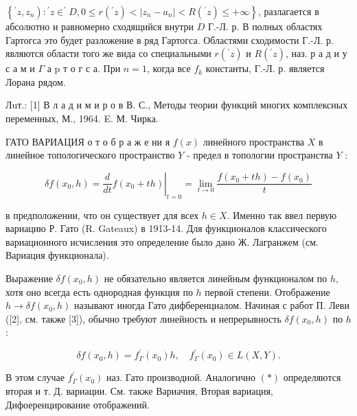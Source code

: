 \documentclass[10pt]{article}
\begin{document}
$\left.\left\{{ }^{\prime} z, z_{n}\right):{ }^{\prime} z \in^{\prime} D, 0 \leqslant r\left({ }^{\prime} z\right)<\left|z_{n}-a_{n}\right|<R\left({ }^{\prime} z\right) \leqslant+\infty\right\}$, разлагается в абсолютно и равномерно сходящийся внутри $D$ Г.-Л. р. В полных областях Гартогса это будет разложение в ряд Гартогса. Областями сходимости Г.-Л. р. являются области того же вида со специальными $r\left({ }^{\prime} z\right)$ и $R\left({ }^{\prime} z\right)$, наз. р а д и у с а м и $\Gamma$ а $\mathrm{p}$ т о г с а. При $n=1$, когда все $f_{k}$ константы, Г.-Л. р. является Лорана рядом.



Лuт.: [1] В л а д и м и р о в В. С., Методы теории функций многих комплексных переменных, М., 1964. E. М. Чирка.



ГАТО ВАРИАЦИЯ о т о б р а ж е ни я $f(x)$ линейного пространства $X$ в линейное топологического пространство $Y$ - предел в топологии пространства $Y$ :



\[

\delta f\left(x_{0}, h\right)=\left.\frac{d}{d t} f\left(x_{0}+t h\right)\right|_{t=0}=\lim _{t \rightarrow 0} \frac{f\left(x_{0}+t h\right)-f\left(x_{0}\right)}{t}

\]



в предположении, что он существует для всех $h \in X$. Именно так ввел первую вариацию Р. Гато (R. Gateaux) в 1913-14. Для функционалов классического вариационного исчисления это определение было дано Ж. Лагранжем (см. Вариация функционала).



Выражение $\delta f\left(x_{0}, h\right)$ не обязательно является линейным функционалом по $h$, хотя оно всегда есть однородная функция по $h$ первой степени. Отображение $h \rightarrow \delta f\left(x_{0}, h\right)$ называют иногда Гато дифберенциалом. Начиная с работ П. Леви ([2], см. также [3]), обычно требуют линейность и непрерывность $\delta f\left(x_{0}, h\right)$ по $h$ :



\[

\delta f\left(x_{0}, h\right)=f_{\Gamma}^{\prime}\left(x_{0}\right) h, \quad f_{\Gamma}^{\prime}\left(x_{0}\right) \in L(X, Y) .

\]



В этом случае $f_{\Gamma}^{\prime}\left(x_{0}\right)$ наз. Гато производной. Аналогично $(*)$ определяются вторая и т. Д. вариации. См. также Вариачия, Вторая вариация, Дифоеренцирование отображений.
\end{document}
